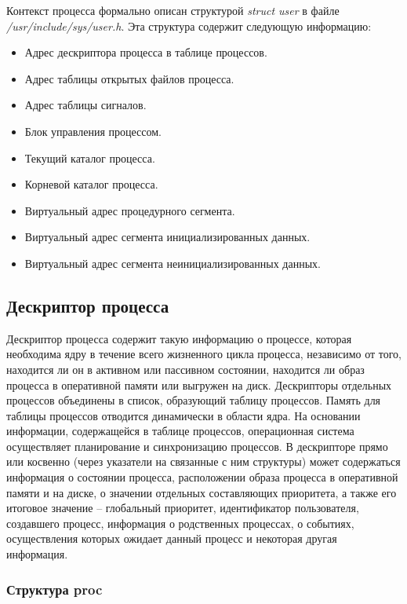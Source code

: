 \documentclass[14pt,a4paper,report]{report}
\begin{document}
Контекст процесса формально описан структурой \emph{struct user} в файле \emph{/usr/include/sys/user.h}. Эта структура содержит следующую информацию:

\begin{itemize}
	\item Адрес дескриптора процесса в таблице процессов.
	\item Адрес таблицы открытых файлов процесса.
	\item Адрес таблицы сигналов.
	\item Блок управления процессом.
	\item Текущий каталог процесса.
	\item Корневой каталог процесса.
	\item Виртуальный адрес процедурного сегмента.
	\item Виртуальный адрес сегмента инициализированных данных.
	\item Виртуальный адрес сегмента неинициализированных данных.
\end{itemize}

\clearpage

\subsection{Дескриптор процесса}

Дескриптор процесса содержит такую информацию о процессе, которая необходима ядру в течение всего жизненного цикла процесса, независимо от того, находится ли он в активном или пассивном состоянии, находится ли образ процесса в оперативной памяти или выгружен на диск. Дескрипторы отдельных процессов объединены в список, образующий таблицу процессов. Память для таблицы процессов отводится динамически в области ядра. На основании информации, содержащейся в таблице процессов, операционная система осуществляет планирование и синхронизацию процессов. В дескрипторе прямо или косвенно (через указатели на связанные с ним структуры) может содержаться информация о состоянии процесса, расположении образа процесса в оперативной памяти и на диске, о значении отдельных составляющих приоритета, а также его итоговое значение – глобальный приоритет, идентификатор пользователя, создавшего процесс, информация о родственных процессах, о событиях, осуществления которых ожидает данный процесс и некоторая другая информация.

\subsubsection{Структура proc}
\end{document}
